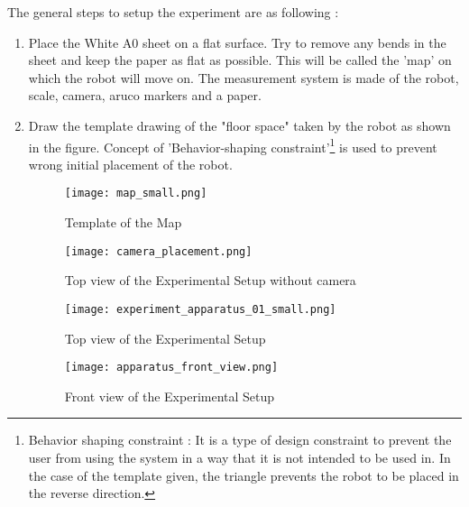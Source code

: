 \documentclass[10pt,a4paper]{article}
\begin{document}
The general steps to setup the experiment are as following :
\begin{enumerate}
    \item
    Place the White A0 sheet on a flat surface.  Try to remove any bends in the sheet and keep the paper as flat as possible. This will be called the 'map' on which the robot will move on. The measurement system is made of the robot, scale, camera, aruco markers and a paper. 
    \item
    Draw the template drawing of the "floor space" taken by the robot as shown in the figure. Concept of 'Behavior-shaping constraint'\footnote{Behavior shaping constraint : It is a type of design constraint to prevent the user from using the system in a way that it is not intended to be used in. In the case of the template given, the triangle prevents the robot to be placed in the reverse direction.} is used to prevent wrong initial placement of the robot.
    
    
    \begin{figure}[H]
	\centering
    \texttt{[image: map\_small.png]}
    \caption{ Template of the Map}
    \end{figure}    
      
    \begin{figure}[H]
    	\centering
    	\texttt{[image: camera\_placement.png]}
    	\caption{Top view of the Experimental Setup without camera}
    \end{figure}
    
    \begin{figure}[H]
    	\centering
    	\texttt{[image: experiment\_apparatus\_01\_small.png]}
    	\caption{Top view of the Experimental Setup}
    \end{figure}
    
    \begin{figure}[H]
     	\centering
     	\texttt{[image: apparatus\_front\_view.png]}
     	\caption{Front view of the Experimental Setup}
    \end{figure}
    

\end{enumerate}
\end{document}

